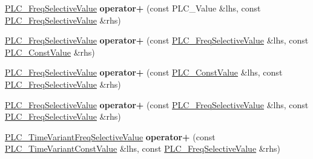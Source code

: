 \begin{DoxyCompactItemize}
\item 
\hypertarget{classns3_1_1PLC__FreqSelectiveValue_a230380c1d0fc4df0b8f578e0538affa6}{\hyperlink{classns3_1_1PLC__FreqSelectiveValue}{\-P\-L\-C\-\_\-\-Freq\-Selective\-Value} {\bfseries operator+} (const \-P\-L\-C\-\_\-\-Value \&lhs, const \hyperlink{classns3_1_1PLC__FreqSelectiveValue}{\-P\-L\-C\-\_\-\-Freq\-Selective\-Value} \&rhs)}\label{classns3_1_1PLC__FreqSelectiveValue_a230380c1d0fc4df0b8f578e0538affa6}

\item 
\hypertarget{classns3_1_1PLC__FreqSelectiveValue_aba011f784f7339f6e32f603f19258edf}{\hyperlink{classns3_1_1PLC__FreqSelectiveValue}{\-P\-L\-C\-\_\-\-Freq\-Selective\-Value} {\bfseries operator+} (const \hyperlink{classns3_1_1PLC__FreqSelectiveValue}{\-P\-L\-C\-\_\-\-Freq\-Selective\-Value} \&lhs, const \hyperlink{classns3_1_1PLC__ConstValue}{\-P\-L\-C\-\_\-\-Const\-Value} \&rhs)}\label{classns3_1_1PLC__FreqSelectiveValue_aba011f784f7339f6e32f603f19258edf}

\item 
\hypertarget{classns3_1_1PLC__FreqSelectiveValue_aca7f5f740941099c021d41f7141a6484}{\hyperlink{classns3_1_1PLC__FreqSelectiveValue}{\-P\-L\-C\-\_\-\-Freq\-Selective\-Value} {\bfseries operator+} (const \hyperlink{classns3_1_1PLC__ConstValue}{\-P\-L\-C\-\_\-\-Const\-Value} \&lhs, const \hyperlink{classns3_1_1PLC__FreqSelectiveValue}{\-P\-L\-C\-\_\-\-Freq\-Selective\-Value} \&rhs)}\label{classns3_1_1PLC__FreqSelectiveValue_aca7f5f740941099c021d41f7141a6484}

\item 
\hypertarget{classns3_1_1PLC__FreqSelectiveValue_a4267d658fc4b0452fd5d79d0b5317259}{\hyperlink{classns3_1_1PLC__FreqSelectiveValue}{\-P\-L\-C\-\_\-\-Freq\-Selective\-Value} {\bfseries operator+} (const \hyperlink{classns3_1_1PLC__FreqSelectiveValue}{\-P\-L\-C\-\_\-\-Freq\-Selective\-Value} \&lhs, const \hyperlink{classns3_1_1PLC__FreqSelectiveValue}{\-P\-L\-C\-\_\-\-Freq\-Selective\-Value} \&rhs)}\label{classns3_1_1PLC__FreqSelectiveValue_a4267d658fc4b0452fd5d79d0b5317259}

\item 
\hypertarget{classns3_1_1PLC__FreqSelectiveValue_aa0651ee3ee605b4d029fcb89d93b5dd2}{\hyperlink{classns3_1_1PLC__TimeVariantFreqSelectiveValue}{\-P\-L\-C\-\_\-\-Time\-Variant\-Freq\-Selective\-Value} {\bfseries operator+} (const \hyperlink{classns3_1_1PLC__TimeVariantConstValue}{\-P\-L\-C\-\_\-\-Time\-Variant\-Const\-Value} \&lhs, const \hyperlink{classns3_1_1PLC__FreqSelectiveValue}{\-P\-L\-C\-\_\-\-Freq\-Selective\-Value} \&rhs)}\label{classns3_1_1PLC__FreqSelectiveValue_aa0651ee3ee605b4d029fcb89d93b5dd2}


\end{DoxyCompactItemize}
